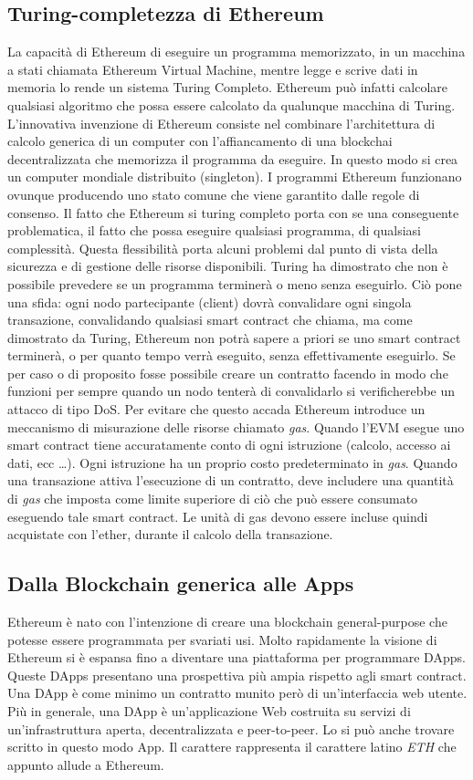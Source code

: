 \subsection{Turing-completezza di Ethereum}
La capacità di Ethereum di eseguire un programma memorizzato, in un macchina a stati chiamata Ethereum Virtual Machine, mentre legge e scrive dati in memoria lo rende un sistema Turing Completo. Ethereum può infatti calcolare qualsiasi algoritmo che possa essere calcolato da qualunque macchina di Turing.
L'innovativa invenzione di Ethereum consiste nel combinare l'architettura di calcolo generica di un computer con l'affiancamento di una blockchai decentralizzata che memorizza il programma da eseguire. In questo modo si crea un computer mondiale distribuito (singleton). I programmi Ethereum funzionano ovunque producendo uno stato comune che viene garantito dalle regole di consenso. 
Il fatto che Ethereum si turing completo porta con se una conseguente problematica, il fatto che possa eseguire qualsiasi programma, di qualsiasi complessità. Questa flessibilità porta alcuni problemi dal punto di vista della sicurezza e di gestione delle risorse disponibili. 
Turing ha dimostrato che non è possibile prevedere se un programma terminerà o meno senza eseguirlo. Ciò pone una sfida: ogni nodo partecipante (client) dovrà convalidare ogni singola transazione, convalidando qualsiasi smart contract che chiama, ma come dimostrato da Turing, Ethereum non potrà sapere a priori se uno smart contract terminerà, o per quanto tempo verrà eseguito, senza effettivamente eseguirlo. Se per caso o di proposito fosse possibile creare un contratto facendo in modo che funzioni per sempre quando un nodo tenterà di convalidarlo si verificherebbe un attacco di tipo DoS. Per evitare che questo accada Ethereum introduce un meccanismo di misurazione delle risorse chiamato \textit{gas}. Quando l'EVM esegue uno smart contract tiene accuratamente conto di ogni istruzione (calcolo, accesso ai dati, ecc \dots). Ogni istruzione ha un proprio costo predeterminato in \textit{gas}. Quando una transazione attiva l'esecuzione di un contratto, deve includere una quantità di \textit{gas} che imposta come limite superiore di ciò che può essere consumato eseguendo tale smart contract. Le unità di gas devono essere incluse quindi acquistate con l'ether, durante il calcolo della transazione.

\subsection{Dalla Blockchain generica alle \DH Apps}
Ethereum è nato con l'intenzione di creare una blockchain general-purpose che potesse essere programmata per svariati usi. Molto rapidamente la visione di Ethereum si è espansa fino a diventare una piattaforma per programmare DApps. Queste DApps presentano una prospettiva più ampia rispetto agli smart contract. Una DApp è come minimo un contratto munito però di un'interfaccia web utente. Più in generale, una DApp è un'applicazione Web costruita su servizi di un'infrastruttura aperta, decentralizzata e peer-to-peer. Lo si può anche trovare scritto in questo modo \DH App. Il carattere \DH rappresenta il carattere latino \textit{ETH} che appunto allude a Ethereum.

